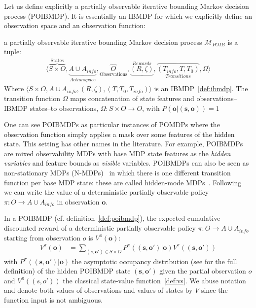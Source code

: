 Let us define explicitly a partially observable iterative bounding Markov decision process (POIBMDP). It is essentially an IBMDP for which we explicitly define an observation space and an observation function:
\begin{definition}\label{def:poibmdp} a partially observable iterative bounding Markov decision process $\mathcal{M}_{POIB}$ is a tuple:
    \begin{align*}
        \langle \overbrace{S\times O}^{\text{States}}, \underbrace{A\cup A_{info}}_{Action space},\overbrace{O}_{\text{Observations}} ,\underbrace{(R, \zeta)}^{Rewards}, \overbrace{(T_{info}, T, T_0)}_{Transitions}, \Omega \rangle
    \end{align*}
    Where $\langle S\times O, A\cup A_{info}, (R, \zeta),( T, T_0, T_{info})\rangle$ is an IBMDP~\ref{def:ibmdp}.
    The transition function $\Omega$ maps concatenation of state features and observations--IBMDP states--to observations, $\Omega:S\times O \rightarrow O$, with $P(\boldsymbol{o}|(\boldsymbol{s}, \boldsymbol{o}))=1$ 
\end{definition}

One can see POIBMDPs as particular instances of POMDPs where the observation function simply applies a mask over some features of the hidden state.
This setting has other names in the literature.
For example, POIBMDPs are mixed observability MDPs \cite{momdp} with base MDP state features as the \textit{hidden variables} and feature bounds as \textit{visible} variables.
POIBMDPs can also be seen as non-stationary MDPs (N-MDPs)~\cite{learning-pomdp} in which there is one different transition function per base MDP state: these are called hidden-mode MDPs~\cite{hmmdp}.
Following~\cite{learning-pomdp} we can write the value of a deterministic partially observable policy $\pi:O\rightarrow A\cup A_{info}$ in observation $\boldsymbol{o}$.

\begin{definition}\label{def:vpo} In a POIBMDP (cf. definition~\ref{def:poibmdp}), the expected cumulative discounted reward of a deterministic partially observable policy $\pi:O\rightarrow A\cup A_{info}$ starting from observation $o$ is $V^{\pi}(\boldsymbol{o})$:
    \begin{align*}
        V^{\pi}(\boldsymbol{o}) &= \underset{(s,\boldsymbol{o}')\in S\times O}{\sum}P^{\pi}((\boldsymbol{s}, \boldsymbol{o}')|\boldsymbol{o})V^{\pi}((\boldsymbol{s}, \boldsymbol{o}'))
    \end{align*}
with $P^{\pi}((\boldsymbol{s}, \boldsymbol{o}')|\boldsymbol{o})$ the asymptotic occupancy distribution (see \cite[section 4]{learning-pomdp} for the full definition) of the hidden POIBMDP state $(\boldsymbol{s},\boldsymbol{o}')$ given the partial observation $o$ and $V^{\pi}((s, o'))$ the classical state-value function~\ref{def:vs}.
We abuse notation and denote both values of observations and values of states by $V$ since the function input is not ambiguous.
\end{definition}

